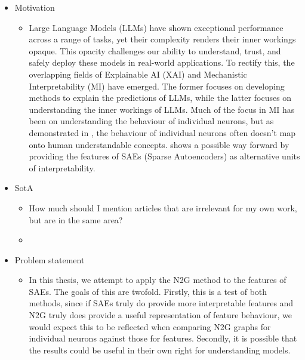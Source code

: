 \documentclass[../main.tex]{subfiles}
\begin{document}
\begin{itemize}
    \item Motivation
    \begin{itemize}
        \item Large Language Models (LLMs) have shown exceptional performance across a range of tasks, yet their complexity renders their inner workings opaque.
        This opacity challenges our ability to understand, trust, and safely deploy these models in real-world applications.
        To rectify this, the overlapping fields of Explainable AI (XAI) and Mechanistic Interpretability (MI) have emerged.
        The former focuses on developing methods to explain the predictions of LLMs, while the latter focuses on understanding the inner workings of LLMs.
        Much of the focus in MI has been on understanding the behaviour of individual neurons, but as demonstrated in \citet{elhage_toy_2022}, the behaviour of individual neurons often doesn't map onto human understandable concepts.
        \citet{bricken_towards_2023} shows a possible way forward by providing the features of SAEs (Sparse Autoencoders) as alternative units of interpretability. 
    \end{itemize}
    \item SotA
    \begin{itemize}
        \item How much should I mention articles that are irrelevant for my own work, but are in the same area?
        \item 
    \end{itemize}
    \item Problem statement
    \begin{itemize}
        \item In this thesis, we attempt to apply the N2G method to the features of SAEs.
        The goals of this are twofold.
        Firstly, this is a test of both methods, since if SAEs truly do provide more interpretable features and N2G truly does provide a useful representation of feature behaviour, we would expect this to be reflected when comparing N2G graphs for individual neurons against those for features. 
        Secondly, it is possible that the results could be useful in their own right for understanding models.
    \end{itemize}
\end{itemize}

\subbib
\end{document}
